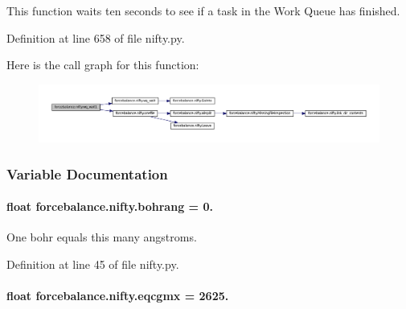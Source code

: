 This function waits ten seconds to see if a task in the Work Queue has finished. 



Definition at line 658 of file nifty.\-py.



Here is the call graph for this function\-:\nopagebreak
\begin{figure}[H]
\begin{center}
\leavevmode
\includegraphics[width=350pt]{namespaceforcebalance_1_1nifty_a374aac2ef003be02fab49b20ff0a82f0_cgraph}
\end{center}
\end{figure}




\subsubsection{Variable Documentation}
\hypertarget{namespaceforcebalance_1_1nifty_a31a8d4a4240a1325bd4fa10033b7eee0}{
\paragraph[{bohrang}]{\setlength{\rightskip}{0pt plus 5cm}float forcebalance.\-nifty.\-bohrang = 0.}}\label{namespaceforcebalance_1_1nifty_a31a8d4a4240a1325bd4fa10033b7eee0}


One bohr equals this many angstroms. 



Definition at line 45 of file nifty.\-py.

\hypertarget{namespaceforcebalance_1_1nifty_a7cec4d46378b888cd867de05d0168d96}{
\paragraph[{eqcgmx}]{\setlength{\rightskip}{0pt plus 5cm}float forcebalance.\-nifty.\-eqcgmx = 2625.}}\label{namespaceforcebalance_1_1nifty_a7cec4d46378b888cd867de05d0168d96}


